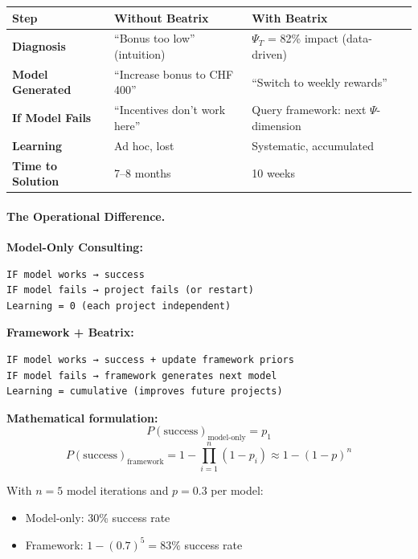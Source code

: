 \begin{center}
\renewcommand{\arraystretch}{1.3}
\begin{tabular}{@{}p{3.5cm}p{4.5cm}p{4.5cm}@{}}
\toprule
\textbf{Step} & \textbf{Without Beatrix} & \textbf{With Beatrix} \\
\midrule
\textbf{Diagnosis} & ``Bonus too low'' (intuition) & $\Psi_T$ = 82\% impact (data-driven) \\
\textbf{Model Generated} & ``Increase bonus to CHF 400'' & ``Switch to weekly rewards'' \\
\textbf{If Model Fails} & ``Incentives don't work here'' & Query framework: next $\Psi$-dimension \\
\textbf{Learning} & Ad hoc, lost & Systematic, accumulated \\
\textbf{Time to Solution} & 7--8 months & 10 weeks \\
\bottomrule
\end{tabular}
\end{center}

\paragraph{The Operational Difference.}

\begin{tcolorbox}[colback=yellow!5!white, colframe=orange!75!black,
    title=\textbf{Model-Only vs.\ Framework + Beatrix}]

\textbf{Model-Only Consulting:}
\begin{verbatim}
IF model works → success
IF model fails → project fails (or restart)
Learning = 0 (each project independent)
\end{verbatim}

\textbf{Framework + Beatrix:}
\begin{verbatim}
IF model works → success + update framework priors
IF model fails → framework generates next model
Learning = cumulative (improves future projects)
\end{verbatim}

\textbf{Mathematical formulation:}
\begin{equation}
P(\text{success})_{\text{model-only}} = p_1
\end{equation}
\begin{equation}
P(\text{success})_{\text{framework}} = 1 - \prod_{i=1}^{n} (1 - p_i) \approx 1 - (1-p)^n
\end{equation}

With $n = 5$ model iterations and $p = 0.3$ per model:
\begin{itemize}[nosep]
    \item Model-only: 30\% success rate
    \item Framework: $1 - (0.7)^5 = 83\%$ success rate
\end{itemize}

\end{tcolorbox}


